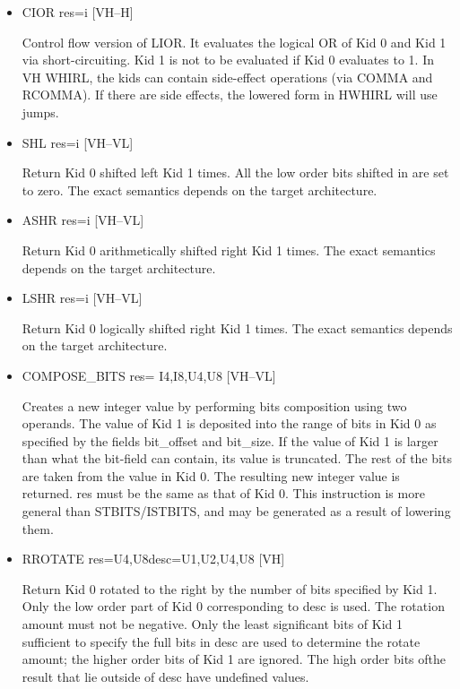 \documentclass{article}
\begin{document}
\begin{itemize}
\item
{}%
CIOR res=i \hfill [VH--H]

Control flow version of
%
LIOR. It evaluates the logical OR of Kid
0 and Kid 1 via short-circuiting. Kid 1 is not to be evaluated if
Kid 0 evaluates to
1. In VH WHIRL, the kids can contain side-effect operations (via
%
COMMA and
%
RCOMMA). If there are side effects, the lowered form in
HWHIRL will use jumps.

\item
{}%
SHL res=i \hfill [VH--VL]

Return Kid 0 shifted left Kid 1 times. All the low order bits
shifted in are set to zero. The exact semantics depends on the target
architecture.

\item
{}%
ASHR res=i \hfill [VH--VL]

Return Kid 0 arithmetically shifted right Kid 1 times. The exact
semantics depends on the target architecture.

\item
{}%
LSHR res=i \hfill [VH--VL]

Return Kid 0 logically shifted right Kid 1 times. The exact semantics
depends on the target architecture.

%
\item  COMPOSE\_BITS res= I4,I8,U4,U8 \hfill [VH--VL]

Creates a new integer value by performing bits composition using
two operands. The value of Kid 1 is deposited into the range of bits
in Kid 0
as specified by the fields bit\_offset and bit\_size. If the value
of Kid 1 is larger than what the bit-field can contain, its value
is truncated. The rest of the bits are taken from the value in Kid
0. The resulting new integer value is returned. res must be the same
as that of Kid 0. This instruction is more general than
%
%
STBITS/ISTBITS,
and may be generated as a result of lowering them.

\item
{}%
RROTATE res=U4,U8desc=U1,U2,U4,U8 \hfill [VH]

Return Kid 0 rotated to the right by the number of bits specified
by Kid 1. Only the low order part of Kid 0 corresponding to desc is
used. The rotation amount must not be negative. Only the least
significant bits of Kid 1 sufficient to specify the full bits in
desc are used to determine the rotate amount; the higher order bits
of Kid 1 are ignored. The high order bits ofthe result that lie
outside of desc have undefined values.


\end{itemize}
\end{document}
